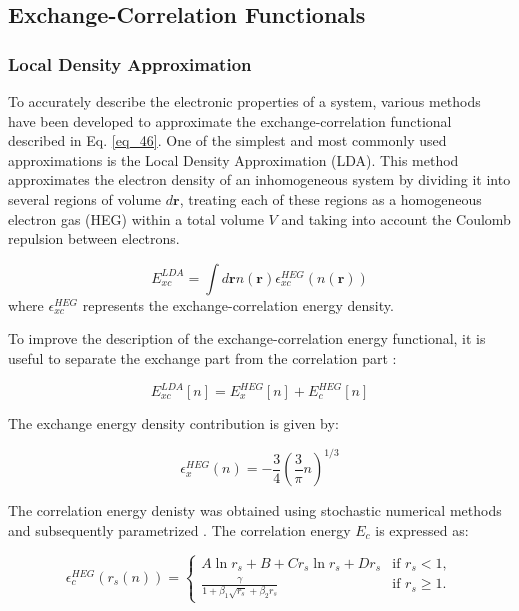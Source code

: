 \subsection{Exchange-Correlation Functionals}
\label{subsection.xc_functionals}
\subsubsection{Local Density Approximation}
\label{subsubsection.LDA}
To accurately describe the electronic properties of a system, various methods have been developed to approximate the exchange-correlation functional described in Eq. \eqref{eq_46}. One of the simplest and most commonly used approximations is the Local Density Approximation \supercite{CeperleyAlder1980, 
PerdewZunger1981}(LDA). This method approximates the electron density of an inhomogeneous system by dividing it into several regions of volume $d\mathbf{r}$, treating each of these regions as a homogeneous electron gas (HEG) within a total volume \( V \) and taking into account the Coulomb repulsion between electrons\supercite{Giustino2014}.


\begin{equation}
	E_{xc} ^{LDA}= \int d \mathbf{r} n (\mathbf{r}) \epsilon_{xc}^{HEG}\left( n (\mathbf{r})\right)
\end{equation}
where $\epsilon_{xc}^{HEG}$ represents the exchange-correlation energy density.

To improve the description of the exchange-correlation energy functional, it is useful to separate the exchange part from the correlation part \supercite{Morin2013}:

\begin{equation}
	E_{xc}^{LDA}[n] = E_{x}^{HEG}[n] + E_{c}^{HEG}[n]
\end{equation}

The exchange energy density  contribution is given by:

\begin{equation}
	\epsilon_{x}^{HEG}(n) = -\dfrac{3}{4} \left( \dfrac{3}{\pi} n \right)^{1/3} 
\end{equation}

The correlation energy  denisty was obtained using stochastic numerical methods and subsequently parametrized \supercite{CeperleyAlder1980,PerdewZunger1981}. The correlation energy \( E_c \) is expressed as:

\begin{equation}
	\epsilon_{c}^{HEG}(r_s (n)) = 
	\begin{cases} 
		A\ln r_s +B + C r_s \ln r_s  + D r_s & \text{if } r_s < 1, \\
		\frac{\gamma}{1 + \beta_{1} \sqrt{r_s} + \beta_{2} r_s} & \text{if } r_s \geq 1.
	\end{cases}
\end{equation}

